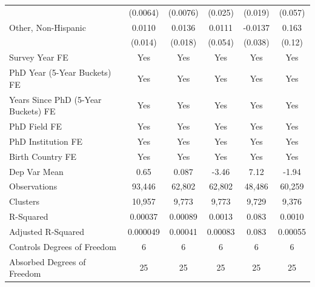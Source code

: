 \begin{table}[htbp]
\begin{tabular}{l*{5}{c}}
  &    (0.0064)         &    (0.0076)         &     (0.025)         &     (0.019)         &     (0.057)         \\
[1em]
Other, Non-Hispanic&      0.0110         &      0.0136         &      0.0111         &     -0.0137         &       0.163         \\
  &     (0.014)         &     (0.018)         &     (0.054)         &     (0.038)         &      (0.12)         \\
[1em]
Survey Year FE&         Yes         &         Yes         &         Yes         &         Yes         &         Yes         \\
[1em]
PhD Year (5-Year Buckets) FE&         Yes         &         Yes         &         Yes         &         Yes         &         Yes         \\
[1em]
Years Since PhD (5-Year Buckets) FE&         Yes         &         Yes         &         Yes         &         Yes         &         Yes         \\
[1em]
PhD Field FE&         Yes         &         Yes         &         Yes         &         Yes         &         Yes         \\
[1em]
PhD Institution FE&         Yes         &         Yes         &         Yes         &         Yes         &         Yes         \\
[1em]
Birth Country FE&         Yes         &         Yes         &         Yes         &         Yes         &         Yes         \\
\hline
Dep Var Mean&        0.65         &       0.087         &       -3.46         &        7.12         &       -1.94         \\
Observations&      93,446         &      62,802         &      62,802         &      48,486         &      60,259         \\
Clusters&      10,957         &       9,773         &       9,773         &       9,729         &       9,376         \\
R-Squared&     0.00037         &     0.00089         &      0.0013         &       0.083         &      0.0010         \\
Adjusted R-Squared&    0.000049         &     0.00041         &     0.00083         &       0.083         &     0.00055         \\
Controls Degrees of Freedom&           6         &           6         &           6         &           6         &           6         \\
Absorbed Degrees of Freedom&          25         &          25         &          25         &          25         &          25         \\

\end{tabular}
\end{table}
